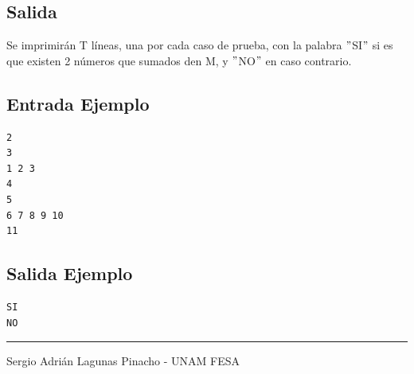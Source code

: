 \documentclass[letter,10pt]{article}
\newcommand{\lyxaddress}[1]{
\par {\raggedright #1
\vspace{1.4em}
\noindent\par}
}
\begin{document}
\subsection*{Salida}

Se imprimirán T líneas, una por cada caso de prueba, con la palabra $"$SI$"$ si es que existen 2 números que sumados den M, y $"$NO$"$ en caso contrario.

\subsection*{Entrada Ejemplo}
\begin{verbatim}
2 
3
1 2 3
4
5
6 7 8 9 10
11
\end{verbatim}

\subsection*{Salida Ejemplo}

\begin{verbatim}
SI
NO

\end{verbatim}

\noindent \rule[0.5ex]{1\columnwidth}{1pt}


\lyxaddress{Sergio Adrián Lagunas Pinacho - UNAM FESA}
\end{document}
